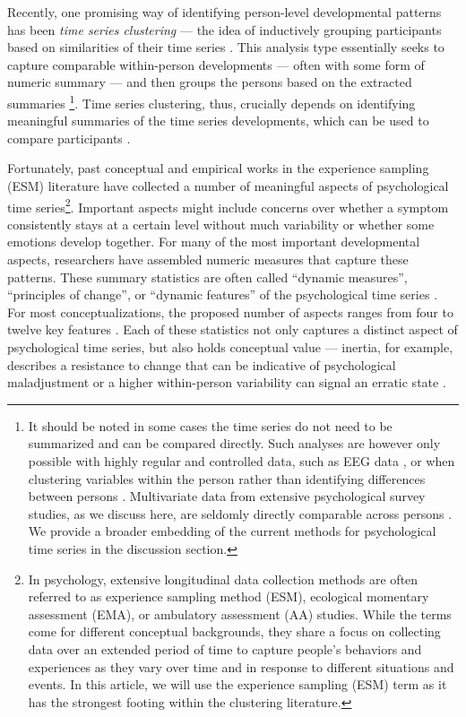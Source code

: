 \documentclass[man, 12pt, a4paper, mask, floatsintext]{apa7}
\theoremstyle{break}
\theoremstyle{plain}
\begin{document}
Recently, one promising way of identifying person-level developmental patterns has been \textit{time series clustering} --- the idea of inductively grouping participants based on similarities of their time series \citep{ariens2020}. This analysis type essentially seeks to capture comparable within-person developments --- often with some form of numeric summary --- and then groups the persons based on the extracted summaries \citep[][]{liao2005}\footnote{It should be noted in some cases the time series do not need to be summarized and can be compared directly. Such analyses are however only possible with highly regular and controlled data, such as EEG data \citep{huang1985}, or when clustering variables within the person rather than identifying differences between persons \citep{haslbeck2022}. Multivariate data from extensive psychological survey studies, as we discuss here, are seldomly directly comparable across persons \citep[e.g., ][]{faloutsos1994}. We provide a broader embedding of the current methods for psychological time series in the discussion section.}. Time series clustering, thus, crucially depends on identifying meaningful summaries of the time series developments, which can be used to compare participants \citep[][]{Aghabozorgi2015}. 

Fortunately, past conceptual and empirical works in the experience sampling (ESM) literature have collected a number of meaningful aspects of psychological time series\footnote{In psychology, extensive longitudinal data collection methods are often referred to as experience sampling method (ESM), ecological momentary assessment (EMA), or ambulatory assessment (AA) studies. While the terms come for different conceptual backgrounds, they share a focus on collecting data over an extended period of time to capture people's behaviors and experiences as they vary over time and in response to different situations and events. In this article, we will use the experience sampling (ESM) term as it has the strongest footing within the clustering literature.}. Important aspects might include concerns over whether a symptom consistently stays at a certain level without much variability or whether some emotions develop together. For many of the most important developmental aspects, researchers have assembled numeric measures that capture these patterns. These summary statistics are often called ``dynamic measures'', ``principles of change'', or ``dynamic features'' of the psychological time series \citep{dejonckheere2019, kuppens2017, krone2018}. For most conceptualizations, the proposed number of aspects ranges from four to twelve key features \citep[][]{wang2006, dejonckheere2019}. Each of these statistics not only captures a distinct aspect of psychological time series, but also holds conceptual value --- inertia, for example, describes a resistance to change that can be indicative of psychological maladjustment \citep{kuppens2010} or a higher within-person variability can signal an erratic state \citep{myin-germeys2018}.
\end{document}

